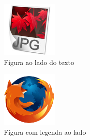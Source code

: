 \documentclass[12pt, a4paper]{article}
\begin{document}
		\lipsum[6]
		
		\lipsum[7]
		
		\begin{figure}
			\centering
			\includegraphics[width=0.25\textwidth]{img1.jpg}
			\caption{Figura ao lado do texto}
		\end{figure}
		
				
		\lipsum[8]
		\lipsum[9]
		
		\begin{figure}
			\includegraphics[width=0.25\textwidth]{img2.png}
			\caption{Figura com legenda ao lado }
		\end{figure}
		
		\lipsum[10]
		
\end{document}
